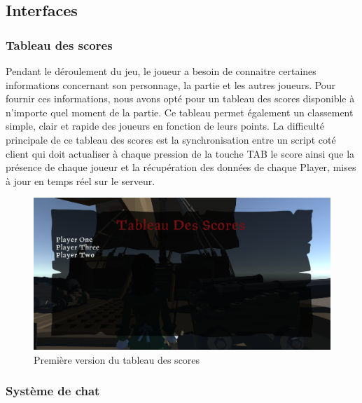 \newpage
\subsection{Interfaces}
    
    \subsubsection{Tableau des scores}
    Pendant le déroulement du jeu, le joueur a besoin de connaitre certaines informations concernant son personnage, la partie et les autres joueurs. 
    Pour fournir ces informations, nous avons opté pour un tableau des scores disponible à n’importe quel moment de la partie. Ce tableau permet également un classement simple, clair et rapide des joueurs en fonction de leurs points.
    La difficulté principale de ce tableau des scores est la synchronisation entre un script coté client qui doit actualiser à chaque pression de la touche TAB le score ainsi que la présence de chaque joueur et la récupération des données de chaque Player, mises à jour en temps réel sur le serveur.
    
    \begin{figure}[hbt!]
            \centering
            \includegraphics[scale=0.3]{img/scoreboard.PNG}
            \caption{Première version du tableau des scores}
    \end{figure}
    
    \subsubsection{Système de chat}
    